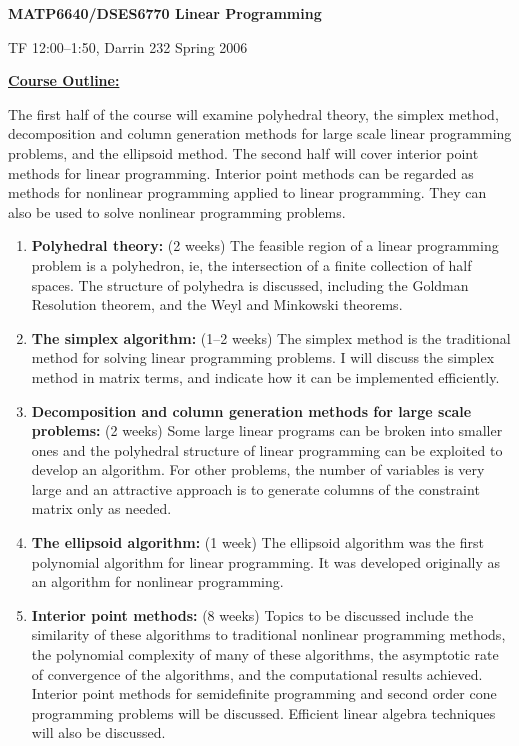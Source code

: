\documentclass[11pt]{article}
\begin{document}
\begin{center}
  {\large\bf  MATP6640/DSES6770 Linear Programming}
\end{center}

\begin{flushright}  TF 12:00--1:50, Darrin 232
       \hspace*{\fill}   Spring 2006  \end{flushright}

{\raggedright  {\bf \underline{Course Outline:}} }
The first half of the course will examine polyhedral theory, the simplex method,
decomposition and column generation methods for large scale linear
programming problems, and the ellipsoid method.
The second half will cover interior point methods for linear programming.
Interior point methods can be regarded as methods for nonlinear programming
applied to linear programming. They can also be used to solve nonlinear
programming problems.

\begin{enumerate}
  \item {\bf Polyhedral theory:} (2 weeks)
    The feasible region of a linear programming problem is a polyhedron,
    ie, the intersection of a finite collection of half spaces.
    The structure of polyhedra is discussed, including the Goldman
    Resolution theorem, and the Weyl and Minkowski theorems.
  \item {\bf The simplex algorithm:} (1--2 weeks)
    The simplex method is the traditional method for solving linear
    programming problems.
    I will discuss the simplex method in matrix terms, and indicate
    how it can be implemented efficiently.
  \item {\bf Decomposition and column generation
    methods for large scale problems:} (2 weeks)
    Some large linear programs can be broken into smaller ones and the
    polyhedral structure of linear programming can be exploited to develop
    an algorithm.
    For other problems, the number of variables is very large and an
    attractive approach is to generate columns of the constraint
    matrix only as needed.
  \item {\bf The ellipsoid algorithm:} (1 week)
    The ellipsoid algorithm was the first polynomial algorithm for linear
    programming. It was developed originally as an algorithm for nonlinear
    programming.
  \item {\bf Interior point methods:} (8 weeks)
    Topics to be discussed include the similarity of these algorithms
    to traditional nonlinear programming methods, the polynomial complexity
    of many of these algorithms, the asymptotic rate of convergence of
    the algorithms, and the computational results achieved.
    Interior point methods for semidefinite programming and
    second order cone programming problems will be discussed.
    Efficient linear algebra techniques will also be discussed.
\end{enumerate}
\end{document}
